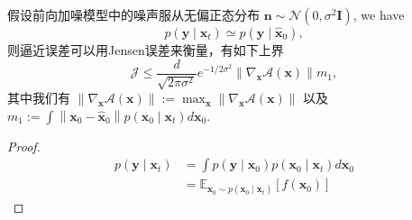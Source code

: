 \begin{theorem}[定理1的证明]
    假设前向加噪模型中的噪声服从无偏正态分布 $\boldsymbol{n} \sim \mathcal{N}\left(0, \sigma^2 \boldsymbol{I}\right)$, we have
\begin{equation}
  p\left(\boldsymbol{y} \mid \boldsymbol{x}_t\right) \simeq p\left(\boldsymbol{y} \mid \hat{\boldsymbol{x}}_0\right),  
\end{equation}
则逼近误差可以用Jensen误差来衡量，有如下上界
\begin{equation}
    \mathcal{J} \leq \frac{d}{\sqrt{2 \pi \sigma^2}} e^{-1 / 2 \sigma^2}\left\|\nabla_{\boldsymbol{x}} \mathcal{A}(\boldsymbol{x})\right\| m_1,
\end{equation}
其中我们有 $\left\|\nabla_{\boldsymbol{x}} \mathcal{A}(\boldsymbol{x})\right\|:=\max _{\boldsymbol{x}}\left\|\nabla_{\boldsymbol{x}} \mathcal{A}(\boldsymbol{x})\right\|$ 以及 $m_1:=\int\left\|\boldsymbol{x}_0-\hat{\boldsymbol{x}}_0\right\| p\left(\boldsymbol{x}_0 \mid \boldsymbol{x}_t\right) d \boldsymbol{x}_0$.
\begin{proof}
 \begin{align}
p\left(\boldsymbol{y} \mid \boldsymbol{x}_t\right) & =\int p\left(\boldsymbol{y} \mid \boldsymbol{x}_0\right) p\left(\boldsymbol{x}_0 \mid \boldsymbol{x}_t\right) d \boldsymbol{x}_0 \\
& =\mathbb{E}_{\boldsymbol{x}_0 \sim p\left(\boldsymbol{x}_0 \mid \boldsymbol{x}_t\right)}\left[f\left(\boldsymbol{x}_0\right)\right]
\end{align}


\end{proof}
\end{theorem}
